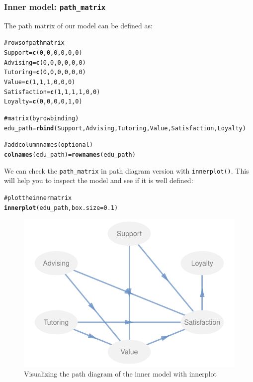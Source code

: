 \documentclass[12pt]{book}\usepackage{graphicx, color}
\makeatletter
\newcommand{\hlfunctioncall}[1]{\textcolor[rgb]{0.501960784313725,0,0.329411764705882}{\textbf{#1}}}%
\newcommand{\hlcomment}[1]{\textcolor[rgb]{0.180392156862745,0.6,0.341176470588235}{#1}}%
\newenvironment{kframe}{%
 \def\at@end@of@kframe{}%
 \ifinner\ifhmode%
  \def\at@end@of@kframe{\end{minipage}}%
  \begin{minipage}{\columnwidth}%
 \fi\fi%
 \def\FrameCommand##1{\hskip\@totalleftmargin \hskip-\fboxsep
 \colorbox{shadecolor}{##1}\hskip-\fboxsep
     \hskip-\linewidth \hskip-\@totalleftmargin \hskip\columnwidth}%
 \MakeFramed {\advance\hsize-\width
   \@totalleftmargin\z@ \linewidth\hsize
   \@setminipage}}%
 {\par\unskip\endMakeFramed%
 \at@end@of@kframe}
\newenvironment{knitrout}{}{} %
\newcommand{\code}[1]{\texttt{#1}}
\makeatother
\begin{document}
\subsubsection*{Inner model: \code{path\_matrix}}
The path matrix of our model can be defined as:
\begin{knitrout}
\color{fgcolor}\begin{kframe}
\begin{alltt}
\hlcomment{# rows of path matrix}
Support = \hlfunctioncall{c}(0, 0, 0, 0, 0, 0)
Advising = \hlfunctioncall{c}(0, 0, 0, 0, 0, 0)
Tutoring = \hlfunctioncall{c}(0, 0, 0, 0, 0, 0)
Value = \hlfunctioncall{c}(1, 1, 1, 0, 0, 0)
Satisfaction = \hlfunctioncall{c}(1, 1, 1, 1, 0, 0)
Loyalty = \hlfunctioncall{c}(0, 0, 0, 0, 1, 0)

\hlcomment{# matrix (by row binding)}
edu_path = \hlfunctioncall{rbind}(Support, Advising, Tutoring, Value, Satisfaction, Loyalty)

\hlcomment{# add column names (optional)}
\hlfunctioncall{colnames}(edu_path) = \hlfunctioncall{rownames}(edu_path)
\end{alltt}
\end{kframe}
\end{knitrout}


We can check the \code{path\_matrix} in path diagram version with \code{innerplot()}. This will help you to inspect the model and see if it is well defined:
\begin{knitrout}
\color{fgcolor}\begin{kframe}
\begin{alltt}
\hlcomment{# plot the inner matrix}
\hlfunctioncall{innerplot}(edu_path, box.size = 0.1)
\end{alltt}
\end{kframe}\begin{figure}[h]


{\centering \includegraphics[width=.8\linewidth,height=.5\linewidth]{figure/edu_innerplot} 

}

\caption[Visualizing the path diagram of the inner model with innerplot]{Visualizing the path diagram of the inner model with innerplot\label{fig:edu_innerplot}}
\end{figure}


\end{knitrout}
\end{document}
